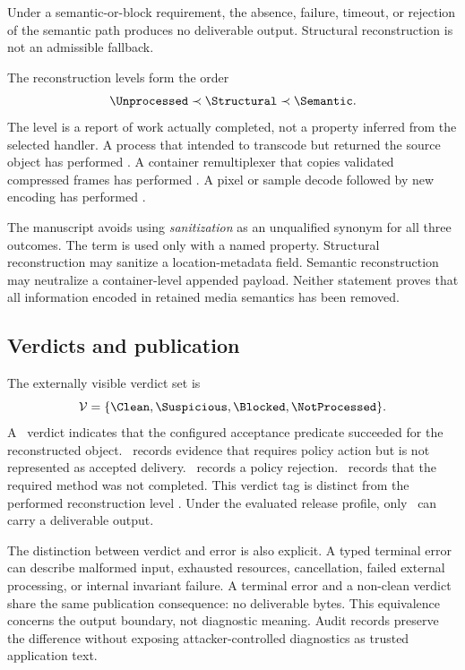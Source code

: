 \begin{definition}
Under a semantic-or-block requirement, the absence, failure, timeout, or
rejection of the semantic path produces no deliverable output. Structural
reconstruction is not an admissible fallback.
\end{definition}

The reconstruction levels form the order
\begin{equation}
  \Unprocessed \prec \Structural \prec \Semantic.
  \label{eq:term-reconstruction-order}
\end{equation}
The level is a report of work actually completed, not a property inferred from
the selected handler. A process that intended to transcode but returned the
source object has performed \Unprocessed. A container remultiplexer that copies
validated compressed frames has performed \Structural. A pixel or sample
decode followed by new encoding has performed \Semantic.

The manuscript avoids using \emph{sanitization} as an unqualified synonym for
all three outcomes. The term is used only with a named property. Structural
reconstruction may sanitize a location-metadata field. Semantic reconstruction
may neutralize a container-level appended payload. Neither statement proves
that all information encoded in retained media semantics has been removed.

\subsection{Verdicts and publication}

The externally visible verdict set is
\begin{equation}
  \mathcal{V} =
  \{\Clean,\Suspicious,\Blocked,\NotProcessed\}.
  \label{eq:verdict-space}
\end{equation}
A \Clean\ verdict indicates that the configured acceptance predicate succeeded
for the reconstructed object. \Suspicious\ records evidence that requires
policy action but is not represented as accepted delivery.
\Blocked\ records a policy rejection. \NotProcessed\ records that the required
method was not completed. This verdict tag is distinct from the performed
reconstruction level \Unprocessed. Under the evaluated release profile, only \Clean\
can carry a deliverable output.

The distinction between verdict and error is also explicit. A typed terminal
error can describe malformed input, exhausted resources, cancellation, failed
external processing, or internal invariant failure. A terminal error and a
non-clean verdict share the same publication consequence: no deliverable bytes.
This equivalence concerns the output boundary, not diagnostic meaning. Audit
records preserve the difference without exposing attacker-controlled
diagnostics as trusted application text.

